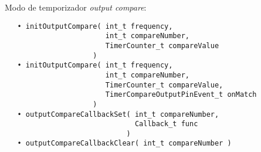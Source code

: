 Modo de temporizador \emph{output compare}:

\begin{verbatim}
   • initOutputCompare( int_t frequency,
                        int_t compareNumber,
                        TimerCounter_t compareValue
                     )
   • initOutputCompare( int_t frequency,
                        int_t compareNumber,
                        TimerCounter_t compareValue,
                        TimerCompareOutputPinEvent_t onMatch
                     )
   • outputCompareCallbackSet( int_t compareNumber,
   							   Callback_t func
                             )
   • outputCompareCallbackClear( int_t compareNumber )
\end{verbatim}






